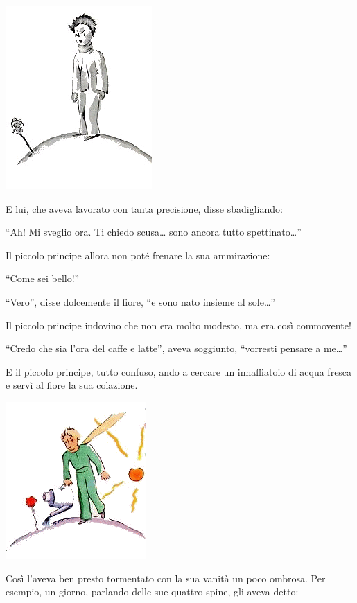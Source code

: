 \documentclass[11pt]{scrbook}
\begin{document}
\begin{center}
\includegraphics{img/8a}
\end{center}

E lui, che aveva lavorato con tanta precisione, disse sbadigliando:

``Ah! Mi sveglio ora. Ti chiedo scusa\ldots{} sono ancora tutto spettinato\ldots{}''

Il piccolo principe allora non poté frenare la sua ammirazione:

``Come sei bello!''

``Vero'', disse dolcemente il fiore, ``e sono nato insieme al sole\ldots{}''

Il piccolo principe indovino che non era molto modesto, ma era così commovente!

``Credo che sia l'ora del caffe e latte'', aveva soggiunto, ``vorresti pensare a me\ldots{}''

E il piccolo principe, tutto confuso, ando a cercare un innaffiatoio di acqua fresca e servì al fiore la sua colazione.

\begin{center}
\includegraphics{img/8b}
\end{center}

Così l'aveva ben presto tormentato con la sua vanità un poco ombrosa. Per esempio, un giorno, parlando delle sue quattro spine, gli aveva detto:
\end{document}
